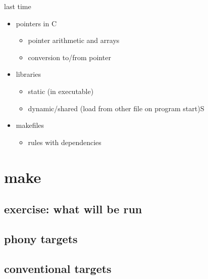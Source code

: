 \date{}
\title{}
\date{}

\begin{frame}
    \titlepage
\end{frame}

\begin{frame}{last time}
    \begin{itemize}
    \item pointers in C
        \begin{itemize}
        \item pointer arithmetic and arrays
        \item conversion to/from pointer
        \end{itemize}
    \item libraries
        \begin{itemize}
        \item static (in executable)
        \item dynamic/shared (load from other file on program start)S
        \end{itemize}
    \item makefiles
        \begin{itemize}
        \item rules with dependencies
        \end{itemize}
    \end{itemize}
\end{frame}



\section{make}

\subsection{exercise: what will be run}



\subsection{phony targets}



\subsection{conventional targets}

